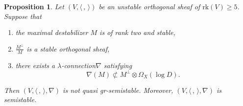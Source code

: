 \documentclass[11pt]{article}
\numberwithin{equation}{section}
\newcommand{\lconnection}{$\lambda$\nobreakdash-con\-nec\-tion\xspace}
\newcommand{\grsemistable}{gr\nobreakdash-semi\-stable\xspace}
\newcommand{\rk}{\mathrm{rk}}
\theoremstyle{plain}
\newtheorem{prop}[thm]{Proposition}
\theoremstyle{definition}
\begin{document}
\begin{prop}\label{irregular}
Let $(V, \langle \,, \, \rangle)$ be an unstable orthogonal sheaf of $\rk(V)\geq 5$. Suppose that
\begin{enumerate}
\item the maximal destabilizer $M$ is of rank two and stable,
\item $\frac{M^\perp}{M}$ is a stable orthogonal sheaf,
\item there exists a \lconnection $\nabla$ satisfying\vspace*{-3pt}
\[
\nabla(M)\not \subset M^\perp\otimes\Omega_X(\log D).
\]
\end{enumerate}
Then $(V,\langle \,, \, \rangle,\nabla)$ is not quasi \grsemistable. Moreover, $(V, \langle \,, \, \rangle, \nabla)$ is semistable.
\end{prop}
\end{document}
